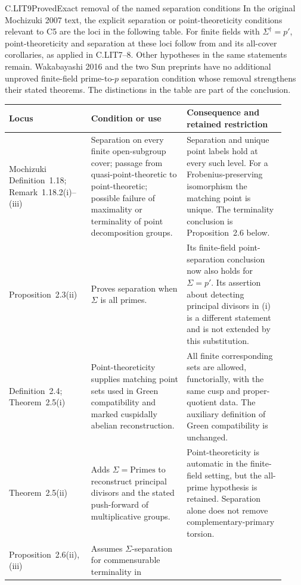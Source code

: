 \begin{claim}{C.LIT9}{Proved}{Exact removal of the named separation conditions}
In the original Mochizuki 2007 text, the explicit separation or
point-theoreticity conditions relevant to C5 are the loci in the
following table. For finite fields with $\Sigma^\dagger=p'$,
point-theoreticity and separation at these loci follow from
 and its all-cover corollaries, as applied in
C.LIT7--8. Other hypotheses in the same statements remain.
Wakabayashi 2016 and the two Sun preprints have no additional
unproved finite-field prime-to-$p$ separation condition whose
removal strengthens their stated theorems. The distinctions in
the table are part of the conclusion.
\end{claim}
\begin{center}\small
\begin{longtable}{p{0.25\linewidth}p{0.33\linewidth}p{0.34\linewidth}}
\toprule
Locus&Condition or use&Consequence and retained restriction\\\midrule
Mochizuki Definition~1.18; Remark~1.18.2(i)--(iii)&
Separation on every finite open-subgroup cover; passage from
quasi-point-theoretic to point-theoretic; possible failure of
maximality or terminality of point decomposition groups.&
Separation and unique point labels hold at every such level.
For a Frobenius-preserving isomorphism the matching point is
unique. The terminality conclusion is Proposition~2.6 below.\\
Proposition~2.3(ii)&
Proves separation when $\Sigma$ is all primes.&
Its finite-field point-separation conclusion now also holds for
$\Sigma=p'$. Its assertion about detecting principal divisors
in (i) is a different statement and is not extended by this
substitution.\\
Definition~2.4; Theorem~2.5(i)&
Point-theoreticity supplies matching point sets used in Green
compatibility and marked cuspidally abelian reconstruction.&
All finite corresponding sets are allowed, functorially, with
the same cusp and proper-quotient data. The auxiliary definition
of Green compatibility is unchanged.\\
Theorem~2.5(ii)&
Adds $\Sigma=\mathrm{Primes}$ to reconstruct principal
divisors and the stated push-forward of multiplicative groups.&
Point-theoreticity is automatic in the finite-field setting,
but the all-prime hypothesis is retained. Separation alone does
not remove complementary-primary torsion.\\
Proposition~2.6(ii),(iii)&
Assumes $\Sigma$-separation for commensurable terminality in

\end{longtable}
\end{center}
